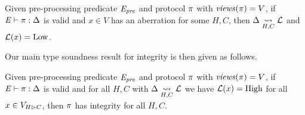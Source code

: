 \begin{lemma}
  Given pre-processing predicate $\mathit{E}_{\mathit{pre}}$ and protocol $\pi$ with
  $\mathit{views}(\pi) = V$, if 
  $\mathit{E} \vdash \pi : \Delta$ is valid
  and $x\in V$ has an aberration for some $H,C$,
  then $\Delta \underset{H,C}{\leadsto} \mathcal{L}$ and $\mathcal{L}(x) = \mathrm{Low}$.
\end{lemma}

Our main type soundness result for integrity is then given as follows.
\begin{theorem}
  Given pre-processing predicate $\mathit{E}_{\mathit{pre}}$ and protocol $\pi$ with
  $\mathit{views}(\pi) = V$, if
  $\mathit{E} \vdash \pi : \Delta$ is valid
  and for all $H,C$ with $\Delta \underset{H,C}{\leadsto} \mathcal{L}$ 
  we have $\mathcal{L}(x) = \mathrm{High}$ for all $x \in V_{H \rhd C}$, then $\pi$
  has integrity for all $H,C$.
\end{theorem}
